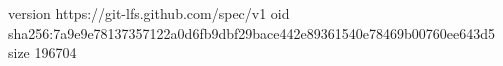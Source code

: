 version https://git-lfs.github.com/spec/v1
oid sha256:7a9e9e78137357122a0d6fb9dbf29bace442e89361540e78469b00760ee643d5
size 196704
